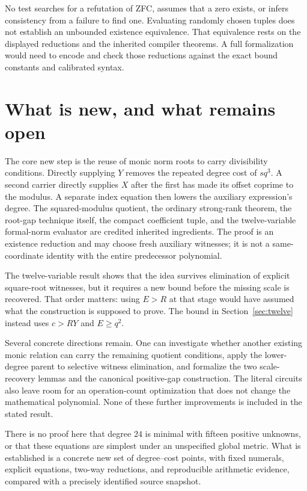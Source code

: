 \documentclass[11pt,a4paper]{article}
\theoremstyle{remark}
\begin{document}
No test searches for a refutation of ZFC, assumes that a zero exists, or
infers consistency from a failure to find one. Evaluating randomly chosen
tuples does not establish an unbounded existence equivalence. That
equivalence rests on the displayed reductions and the inherited compiler
theorems. A full formalization would need to encode and check those
reductions against the exact bound constants and calibrated syntax.

\section{What is new, and what remains open}

The core new step is the reuse of monic norm roots to carry divisibility
conditions. Directly supplying $Y$ removes the repeated degree cost of
$sq^3$. A second carrier directly supplies $X$ after the first has made
its offset coprime to the modulus. A separate index equation then lowers
the auxiliary expression's degree. The squared-modulus quotient, the
ordinary strong-rank theorem, the root-gap technique itself, the compact
coefficient tuple, and the twelve-variable formal-norm evaluator are
credited inherited ingredients. The proof is an existence reduction and
may choose fresh auxiliary witnesses; it is not a same-coordinate
identity with the entire predecessor polynomial.

The twelve-variable result shows that the idea survives elimination of
explicit square-root witnesses, but it requires a new bound before the
missing scale is recovered. That order matters: using $E>R$ at that stage
would have assumed what the construction is supposed to prove. The
bound in Section~\ref{sec:twelve} instead uses $c>RY$ and $E\ge q^2$.

Several concrete directions remain. One can investigate whether another
existing monic relation can carry the remaining quotient conditions, apply
the lower-degree parent to selective witness elimination, and formalize the
two scale-recovery lemmas and the canonical positive-gap construction. The
literal circuits also leave room for an operation-count optimization that
does not change the mathematical polynomial. None of these further
improvements is included in the stated result.

There is no proof here that degree $24$ is minimal with fifteen positive
unknowns, or that these equations are simplest under an unspecified global
metric. What is established is a concrete new set of degree--cost points,
with fixed numerals, explicit equations, two-way reductions, and reproducible
arithmetic evidence, compared with a precisely identified source snapshot.
\end{document}
